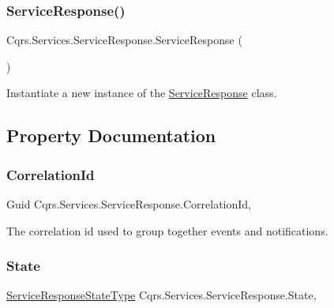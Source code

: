 \subsubsection{\texorpdfstring{Service\+Response()}{ServiceResponse()}}
{\footnotesize\ttfamily Cqrs.\+Services.\+Service\+Response.\+Service\+Response (\begin{DoxyParamCaption}{ }\end{DoxyParamCaption})}



Instantiate a new instance of the \hyperlink{classCqrs_1_1Services_1_1ServiceResponse}{Service\+Response} class. 



\subsection{Property Documentation}
\mbox{\label{classCqrs_1_1Services_1_1ServiceResponse_ad6b80b1b6d1122bcbac201f41ee37124_ad6b80b1b6d1122bcbac201f41ee37124}} 
\subsubsection{\texorpdfstring{Correlation\+Id}{CorrelationId}}
{\footnotesize\ttfamily Guid Cqrs.\+Services.\+Service\+Response.\+Correlation\+Id\hspace{0.3cm}{\ttfamily [get]}, {\ttfamily [set]}}



The correlation id used to group together events and notifications. 

\mbox{\label{classCqrs_1_1Services_1_1ServiceResponse_ab93fe1cf6395706bc77ee3d670854f24_ab93fe1cf6395706bc77ee3d670854f24}} 
\subsubsection{\texorpdfstring{State}{State}}
{\footnotesize\ttfamily \hyperlink{namespaceCqrs_1_1Services_a41411b784c4fcb7eed0cef2a5b522de0_a41411b784c4fcb7eed0cef2a5b522de0}{Service\+Response\+State\+Type} Cqrs.\+Services.\+Service\+Response.\+State\hspace{0.3cm}{\ttfamily [get]}, {\ttfamily [set]}}



